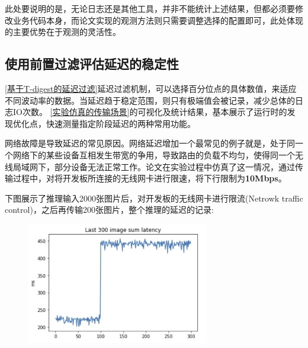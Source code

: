 \documentclass[master]{shtthesis}
\begin{document}
此处要说明的是，无论日志还是其他工具，并非不能统计上述结果，但都必须要修改业务代码本身，而论文实现的观测方法则只需要调整选择的配置即可，此处体现的主要优势在于观测的灵活性。

\subsection{使用前置过滤评估延迟的稳定性}\label{使用前置过滤评估延迟的稳定性}
\ref{基于T-digest的延迟过滤}延迟过滤机制，可以选择百分位点的具体数值，来适应不同波动率的数据。当延迟趋于稳定范围，则只有极端值会被记录，减少总体的日志IO次数。
\ref{实验仿真的传输场景}的可视化及统计结果，基本展示了运行时的发现优化点，快速测量指定阶段延迟的两种常用功能。

网络故障是导致延迟的常见原因。网络延迟增加一个最常见的例子就是，处于同一个网络下的某些设备互相发生带宽的争用，导致路由的负载不均匀，使得同一个无线局域网下，部分设备无法正常工作。论文在实验过程中仿真了这一情况，通过传输过程中，对将开发板所连接的无线网卡进行限速，将下行限制为\textbf{10Mbps}。

下图展示了推理输入2000张图片后，对开发板的无线网卡进行限流(Netrowk traffic control)，之后再传输200张图片，整个推理的延迟的记录:
\begin{figure}[H]
	\centering
	\includegraphics[width=8cm]{img/change.png}
	\label{网卡限速后延迟变化}
\end{figure}
\end{document}

